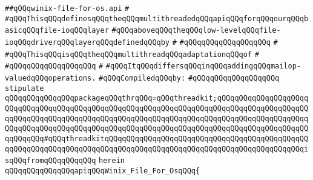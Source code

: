 \label{src/lib/std/src/io/winix-file-for-os.api}
\verb|##qQQqwinix-file-for-os.api|\newline
\verb|#|\newline
\verb|#qQQqThisqQQqdefinesqQQqtheqQQqmultithreadedqQQqapiqQQqforqQQqourqQQqbasicqQQqfile-ioqQQqlayer|\newline
\verb|#qQQqaboveqQQqtheqQQqlow-levelqQQqfile-ioqQQqdriverqQQqlayerqQQqdefinedqQQqby|\newline
\verb|#|\newline
\verb|#qQQqqQQqqQQqqQQqqQQq|\newline
\verb|#|\newline
\verb|#qQQqThisqQQqisqQQqtheqQQqmultithreadqQQqadaptationqQQqof|\newline
\verb|#|\newline
\verb|#qQQqqQQqqQQqqQQqqQQq|\newline
\verb|#|\newline
\verb|#qQQqItqQQqdiffersqQQqinqQQqaddingqQQqmailop-valuedqQQqoperations.|\newline
\newline
\verb|#qQQqCompiledqQQqby:|\newline
\verb|#qQQqqQQqqQQqqQQqqQQq|\newline
\newline
\newline
\newline
\verb|stipulate|\newline
\verb|qQQqqQQqqQQqqQQqpackageqQQqthrqQQq=qQQqthreadkit;qQQqqQQqqQQqqQQqqQQqqQQqqQQqqQQqqQQqqQQqqQQqqQQqqQQqqQQqqQQqqQQqqQQqqQQqqQQqqQQqqQQqqQQqqQQqqQQqqQQqqQQqqQQqqQQqqQQqqQQqqQQqqQQqqQQqqQQqqQQqqQQqqQQqqQQqqQQqqQQqqQQqqQQqqQQqqQQqqQQqqQQqqQQqqQQqqQQqqQQqqQQqqQQqqQQqqQQqqQQqqQQqqQQqqQQqqQQqqQQq#qQQqthreadkitqQQqqQQqqQQqqQQqqQQqqQQqqQQqqQQqqQQqqQQqqQQqqQQqqQQqqQQqqQQqqQQqqQQqqQQqqQQqqQQqqQQqqQQqqQQqqQQqqQQqqQQqqQQqqQQqqQQqisqQQqfromqQQqqQQqqQQq|\newline
\verb|herein|\newline
\newline
\verb|qQQqqQQqqQQqqQQqapiqQQqWinix_File_For_OsqQQq{|\newline
